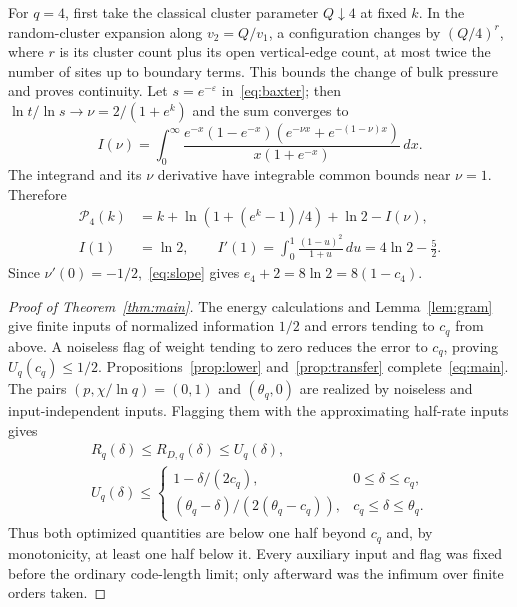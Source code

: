 \documentclass[12pt,letterpaper,onecolumn]{article}
\begin{document}
For $q=4$, first take the classical cluster parameter $Q\downarrow4$ at fixed $k$. In the random-cluster expansion along $v_2=Q/v_1$, a configuration changes by $(Q/4)^r$, where $r$ is its cluster count plus its open vertical-edge count, at most twice the number of sites up to boundary terms. This bounds the change of bulk pressure and proves continuity. Let $s=e^{-\varepsilon}$ in~\eqref{eq:baxter}; then $\ln t/\ln s\to\nu=2/(1+e^k)$ and the sum converges to
\[
I(\nu)=\int_0^\infty
\frac{e^{-x}(1-e^{-x})(e^{-\nu x}+e^{-(1-\nu)x})}{x(1+e^{-x})}\,dx.
\]
The integrand and its $\nu$ derivative have integrable common bounds near $\nu=1$. Therefore
\begin{align*}
\mathcal P_4(k)&=k+\ln(1+(e^k-1)/4)+\ln2-I(\nu),\\
I(1)&=\ln2,\qquad
I'(1)=\int_0^1\frac{(1-u)^2}{1+u}\,du=4\ln2-\tfrac52.
\end{align*}
Since $\nu'(0)=-1/2$,~\eqref{eq:slope} gives
$e_4+2=8\ln2=8(1-c_4)$.


\begin{proof}[Proof of Theorem~\ref{thm:main}]
The energy calculations and Lemma~\ref{lem:gram} give finite inputs of normalized information $1/2$ and errors tending to $c_q$ from above. A noiseless flag of weight tending to zero reduces the error to $c_q$, proving $U_q(c_q)\le1/2$. Propositions~\ref{prop:lower} and~\ref{prop:transfer} complete~\eqref{eq:main}.
The pairs $(p,\chi/\ln q)=(0,1)$ and $(\theta_q,0)$ are realized by noiseless and input-independent inputs. Flagging them with the approximating half-rate inputs gives
\begin{equation}\label{eq:affine}
\begin{gathered}
R_q(\delta)\le R_{D,q}(\delta)\le U_q(\delta),\\
U_q(\delta)\le
\begin{cases}
1-\delta/(2c_q),&0\le\delta\le c_q,\\
(\theta_q-\delta)/(2(\theta_q-c_q)),&c_q\le\delta\le\theta_q.
\end{cases}
\end{gathered}
\end{equation}
Thus both optimized quantities are below one half beyond $c_q$ and, by monotonicity, at least one half below it. Every auxiliary input and flag was fixed before the ordinary code-length limit; only afterward was the infimum over finite orders taken.
\end{proof}
\end{document}
